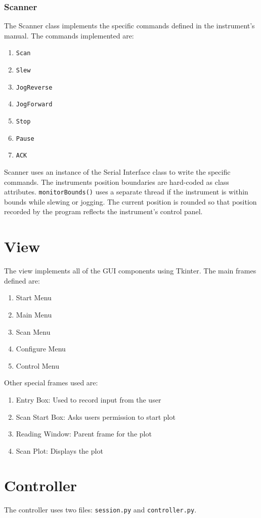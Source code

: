 \documentclass[11pt]{article}
\begin{document}
\subsubsection{Scanner}
The Scanner class implements the specific commands defined in the instrument's manual. The commands implemented are:
\begin{enumerate}
    \item \texttt{Scan}
    \item \texttt{Slew}
    \item \texttt{JogReverse}
    \item \texttt{JogForward}
    \item \texttt{Stop}
    \item \texttt{Pause}
    \item \texttt{ACK}
\end{enumerate}
Scanner uses an instance of the Serial Interface class to write the specific commands.
The instruments position boundaries are hard-coded as class attributes.  \texttt{monitorBounds()} uses a separate thread if the instrument is within bounds while slewing or jogging. 
The current position is rounded so that position recorded by the program reflects the instrument's control panel. 
\section{View}
The view implements all of the GUI components using Tkinter. The main frames defined are:
\begin{enumerate}
    \item Start Menu
    \item Main Menu
    \item Scan Menu
    \item Configure Menu
    \item Control Menu
\end{enumerate}
Other special frames used are:
\begin{enumerate}
    \item Entry Box: Used to record input from the user 
    \item Scan Start Box: Asks users permission to start plot 
    \item Reading Window: Parent frame for the plot 
    \item Scan Plot: Displays the plot  
\end{enumerate}
\section{Controller}
The controller uses two files: \texttt{session.py} and \texttt{controller.py}.
\end{document}
